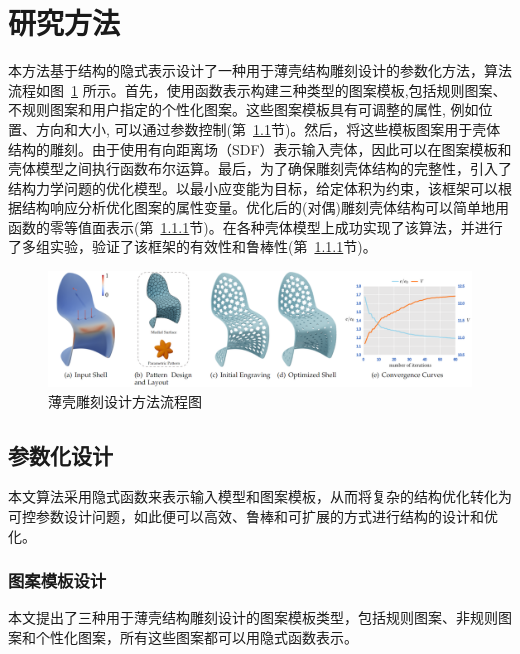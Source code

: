 \section{研究方法}

本方法基于结构的隐式表示设计了一种用于薄壳结构雕刻设计的参数化方法，算法流程如图~\ref{fig:thin-shell-pipeline} 所示。首先，使用函数表示构建三种类型的图案模板,包括规则图案、不规则图案和用户指定的个性化图案。这些图案模板具有可调整的属性, 例如位置、方向和大小, 可以通过参数控制(第~\ref{subsec:parametric-design}节)。然后，将这些模板图案用于壳体结构的雕刻。由于使用有向距离场（SDF）表示输入壳体，因此可以在图案模板和壳体模型之间执行函数布尔运算。最后，为了确保雕刻壳体结构的完整性，引入了结构力学问题的优化模型。以最小应变能为目标，给定体积为约束，该框架可以根据结构响应分析优化图案的属性变量。优化后的(对偶)雕刻壳体结构可以简单地用函数的零等值面表示(第~\ref{}节)。在各种壳体模型上成功实现了该算法，并进行了多组实验，验证了该框架的有效性和鲁棒性(第~\ref{}节)。


\begin{figure}[htbp]
    \centering
    \includegraphics[width=1.0\linewidth]{./figures/thin-shell-pipeline}
    \caption{薄壳雕刻设计方法流程图}
    \label{fig:thin-shell-pipeline}
\end{figure}


\subsection{参数化设计}
\label{subsec:parametric-design}
本文算法采用隐式函数来表示输入模型和图案模板，从而将复杂的结构优化转化为可控参数设计问题，如此便可以高效、鲁棒和可扩展的方式进行结构的设计和优化。

\subsubsection{图案模板设计}
本文提出了三种用于薄壳结构雕刻设计的图案模板类型，包括规则图案、非规则图案和个性化图案，所有这些图案都可以用隐式函数表示。


